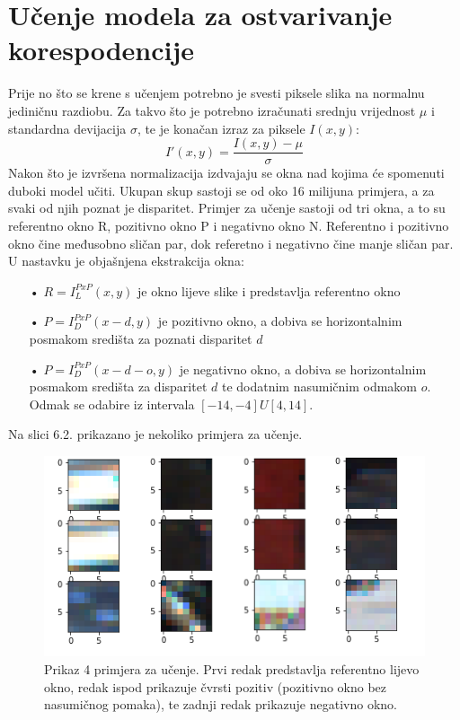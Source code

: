 \documentclass[times, utf8, zavrsni, numeric]{fer}
\begin{document}
\section{Učenje modela za ostvarivanje korespodencije}
Prije no što se krene s učenjem potrebno je svesti piksele slika na normalnu jediničnu razdiobu. Za takvo što je potrebno izračunati srednju vrijednost $\mu$ i standardna devijacija $\sigma$, te je konačan izraz za piksele $I(x,y)$:
\begin{equation}
I'(x,y)= \frac{I(x,y) - \mu}{\sigma}
\label{eq:normalizacija}
\end{equation}
Nakon što je izvršena normalizacija izdvajaju se okna nad kojima će spomenuti duboki model učiti.
Ukupan skup sastoji se od oko 16 milijuna primjera, a za svaki od njih poznat je disparitet.
Primjer za učenje sastoji od tri okna, a to su referentno okno R, pozitivno okno P i negativno okno N. Referentno i pozitivno okno čine međusobno sličan par, dok referetno i negativno čine manje sličan par. U nastavku je objašnjena ekstrakcija okna:
\begin{itemize}
\item[•] $R = I_{L}^{PxP}(x,y)$ je okno lijeve slike i predstavlja referentno okno
\item[•] $P = I_{D}^{PxP}(x-d,y)$ je pozitivno okno, a dobiva se horizontalnim posmakom središta za poznati disparitet $d$
\item[•] $P = I_{D}^{PxP}(x-d-o,y)$ je negativno okno, a dobiva se horizontalnim posmakom središta  za disparitet $d$ te dodatnim nasumičnim odmakom $o$. Odmak se odabire iz intervala $[-14, -4] U [4, 14]$.
\end{itemize}
Na slici 6.2. prikazano je nekoliko primjera za učenje.

\begin{figure}[htb]
\centering
\includegraphics[scale = 0.7]{img/okna.png}
\caption{Prikaz 4 primjera za učenje. Prvi redak predstavlja referentno lijevo okno, redak ispod prikazuje čvrsti pozitiv (pozitivno okno bez nasumičnog pomaka), te zadnji redak prikazuje negativno okno.}
\label{fig:KITTI}
\end{figure}
\end{document}
